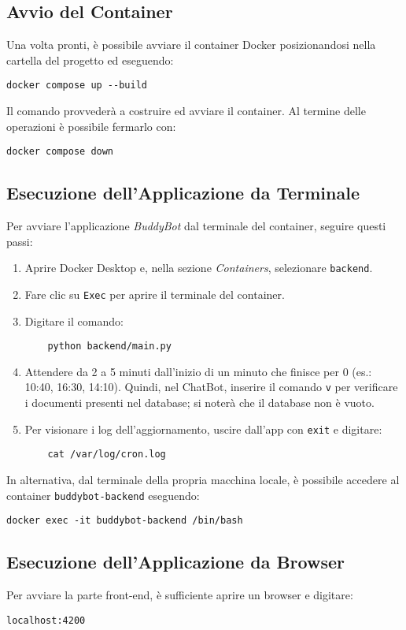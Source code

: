 \subsection{Avvio del Container}
Una volta pronti, è possibile avviare il container Docker posizionandosi nella cartella del progetto ed eseguendo:
\begin{verbatim}
docker compose up --build
\end{verbatim}
Il comando provvederà a costruire ed avviare il container. Al termine delle operazioni è possibile fermarlo con:
\begin{verbatim}
docker compose down
\end{verbatim}

\subsection{Esecuzione dell'Applicazione da Terminale}
Per avviare l'applicazione \textit{BuddyBot} dal terminale del container, seguire questi passi:
\begin{enumerate}
    \item Aprire Docker Desktop e, nella sezione \textit{Containers}, selezionare \texttt{backend}.
    \item Fare clic su \texttt{Exec} per aprire il terminale del container.
    \item Digitare il comando:
    \begin{verbatim}
    python backend/main.py
    \end{verbatim}
    \item Attendere da 2 a 5 minuti dall'inizio di un minuto che finisce per 0 
    (es.: 10:40, 16:30, 14:10). Quindi, nel ChatBot, inserire il comando \texttt{v} 
    per verificare i documenti presenti nel database; si noterà che il database non è vuoto.
    \item Per visionare i log dell’aggiornamento, uscire dall’app con \texttt{exit} e digitare:
    \begin{verbatim}
    cat /var/log/cron.log
    \end{verbatim}
\end{enumerate}

In alternativa, dal terminale della propria macchina locale, è possibile accedere al container 
\texttt{buddybot-backend} eseguendo:
\begin{verbatim}
docker exec -it buddybot-backend /bin/bash
\end{verbatim}

\subsection{Esecuzione dell'Applicazione da Browser}
Per avviare la parte front-end, è sufficiente aprire un browser e digitare:
\begin{verbatim}
localhost:4200
\end{verbatim}
